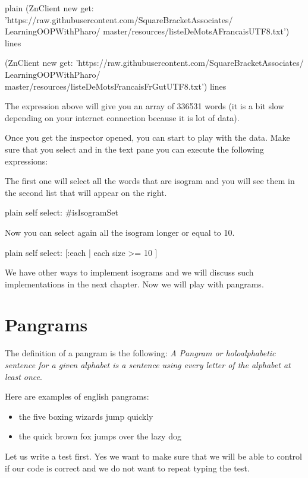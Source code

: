 \documentclass[10pt,twoside,english]{_support/latex/sbabook/sbabook}
\begin{document}
\begin{displaycode}{plain}
(ZnClient new 
    get: 'https://raw.githubusercontent.com/SquareBracketAssociates/
	LearningOOPWithPharo/
	master/resources/listeDeMotsAFrancaisUTF8.txt') lines

(ZnClient new 
    get: 'https://raw.githubusercontent.com/SquareBracketAssociates/
	LearningOOPWithPharo/
	master/resources/listeDeMotsFrancaisFrGutUTF8.txt') lines
\end{displaycode}

The expression above will give you an array of 336531 words (it is a bit slow depending on your internet connection because it is lot of data).

Once you get the inspector opened, you can start to play with the data.
Make sure that you select  and 
in the text pane you can execute the following expressions:

The first one will select all the words that are isogram and you will see them in the second list that will appear on the right. 

\begin{displaycode}{plain}
self select: #isIsogramSet
\end{displaycode}

Now you can select again all the isogram longer or equal to 10. 

\begin{displaycode}{plain}
self select: [:each | each size >= 10 ]
\end{displaycode}

We have other ways to implement isograms and we will discuss such implementations in the next chapter. Now we will play with pangrams.
\section{Pangrams}
 
The definition of a pangram is the following:  \textit{A Pangram or holoalphabetic sentence for a given alphabet is a sentence using every letter of the alphabet at least once}.
 
Here are examples of english pangrams: 

\begin{itemize}
\item the five boxing wizards jump quickly
\item the quick brown fox jumps over the lazy dog
\end{itemize}

Let us write a test first. Yes we want to make sure that we will be able to control if our code is correct and we do not want to repeat typing the test. 
\end{document}
